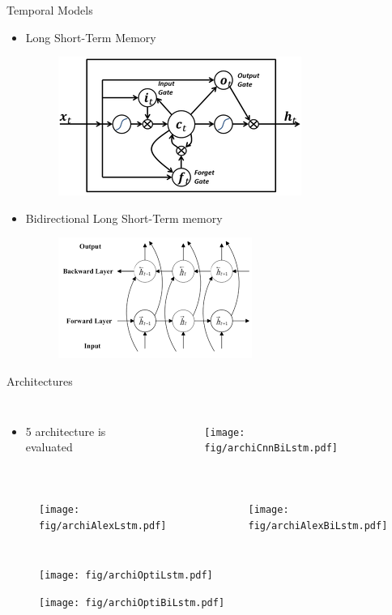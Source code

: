 \documentclass[xcolor=table]{beamer}
\begin{document}
\begin{frame}{Temporal Models}
    \begin{itemize}
        \item Long Short-Term Memory 
        \begin{figure}
            \includegraphics[width=.3\textwidth]{fig/lstm.png}   
        \end{figure}
    \end{itemize}
    \begin{itemize}
        \item Bidirectional Long Short-Term memory 
        \begin{figure}
            \includegraphics[width=.4\textwidth]{fig/biLstm.png}   
        \end{figure}
    \end{itemize}
\end{frame}

\begin{frame}{Architectures}
    \begin{columns}[T]
    \begin{itemize}
        \item 5 architecture is evaluated
    \end{itemize}
    \vspace{-0.7cm}
    \begin{figure}
        \texttt{[image: fig/archiCnnBiLstm.pdf]}
    \end{figure}\pause
    \end{columns}
    \begin{columns}[T]
    \begin{figure}
        \texttt{[image: fig/archiAlexLstm.pdf]}   
    \end{figure}\vspace{-1.2cm}\pause
    \begin{figure}
        \texttt{[image: fig/archiAlexBiLstm.pdf]}   
    \end{figure}\pause
    \end{columns}
    \begin{figure}
        \texttt{[image: fig/archiOptiLstm.pdf]}   
    \end{figure}\vspace{-.5cm}\pause
    \begin{figure}
        \texttt{[image: fig/archiOptiBiLstm.pdf]}   
    \end{figure}
\end{frame}
\end{document}
